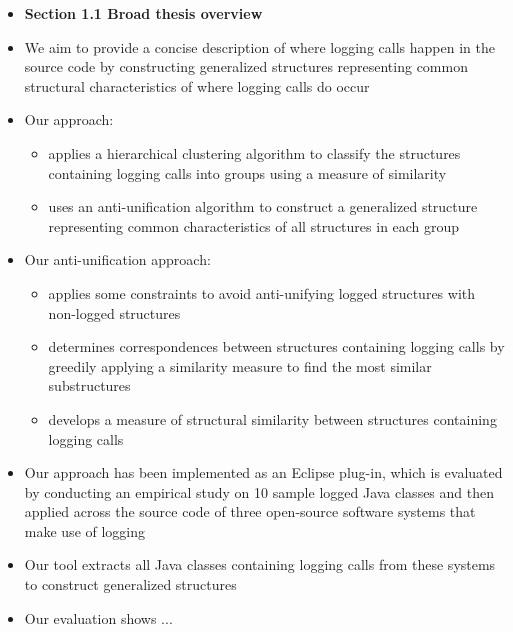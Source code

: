 \documentclass{article}
\newcommand{\bold}{\textbf}
\begin{document}
\begin{itemize} [leftmargin=.1in]
\item \bold{Section 1.1 Broad thesis overview}
\item We aim to provide a concise description of where logging calls happen in the source code by constructing generalized structures representing common structural characteristics of where logging calls do occur
\item{Our approach:}
\begin{itemize}
\item applies a hierarchical clustering algorithm to classify the structures containing logging calls into groups using a measure of similarity
\item uses an anti-unification algorithm to construct a generalized structure representing common characteristics of all structures in each group
\end{itemize}

\item{Our anti-unification approach:}
\begin{itemize}
\item applies some constraints to avoid anti-unifying logged structures with non-logged structures
\item determines correspondences between structures containing logging calls by greedily applying a similarity measure to find the most similar substructures
\item develops a measure of structural similarity between structures containing logging calls
\end{itemize}


\item Our approach has been implemented as an Eclipse plug-in, which is evaluated by conducting an empirical study on 10 sample logged Java classes and then applied across the source code of three open-source software systems that make use of logging
\item Our tool extracts all Java classes containing logging calls from these systems to construct generalized structures

\item Our evaluation shows ...


\end{itemize}
\end{document}
